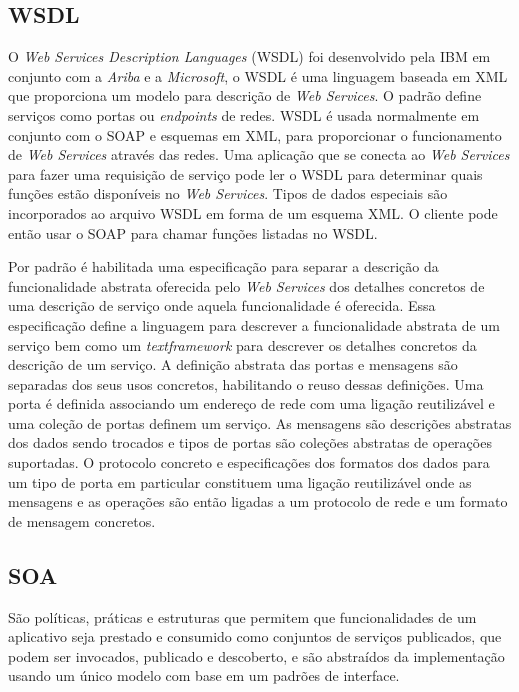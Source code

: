 \documentclass{acm_proc_article-sp}
\begin{document}
		
		
	\subsection{WSDL}
		
		O \emph{Web Services Description Languages} (WSDL) foi desenvolvido pela IBM em conjunto com a \emph{Ariba} e a \emph{Microsoft}, o WSDL é uma linguagem baseada em XML que proporciona um modelo para descrição de \emph{Web Services}. O padrão define serviços como portas ou \emph{endpoints }de redes. WSDL é usada normalmente em conjunto com o SOAP e esquemas em XML, para proporcionar o funcionamento de \emph{Web Services} através das redes. Uma aplicação que se conecta ao \emph{Web Services} para fazer uma requisição de serviço pode ler o WSDL para determinar quais funções estão disponíveis no \emph{Web Services}. Tipos de dados especiais são incorporados ao arquivo WSDL em forma de um esquema XML. O cliente pode então usar o SOAP para chamar funções listadas no WSDL.
		
		Por padrão é habilitada uma especificação para separar a descrição da funcionalidade abstrata oferecida pelo \emph{Web Services} dos detalhes concretos de uma descrição de serviço onde aquela funcionalidade é oferecida. Essa especificação define a linguagem para descrever a funcionalidade abstrata de um serviço bem como um \emph{textframework} para descrever os detalhes concretos da descrição de um serviço. A definição abstrata das portas e mensagens são separadas dos seus usos concretos, habilitando o reuso dessas definições. Uma porta é definida associando um endereço de rede com uma ligação reutilizável e uma coleção de portas definem um serviço. As mensagens são descrições abstratas dos dados sendo trocados e tipos de portas são coleções abstratas de operações suportadas. O protocolo concreto e especificações dos formatos dos dados para um tipo de porta em particular constituem uma ligação reutilizável onde as mensagens e as operações são então ligadas a um protocolo de rede e um formato de mensagem concretos. \cite{APACHE-AXIS}
		
		
	\subsection{SOA}
		
		São políticas, práticas e estruturas que permitem que funcionalidades de um aplicativo seja prestado e consumido como conjuntos de serviços publicados, que podem ser invocados, publicado e descoberto, e são abstraídos da implementação usando um único modelo com base em um padrões de interface.
		
\end{document}
